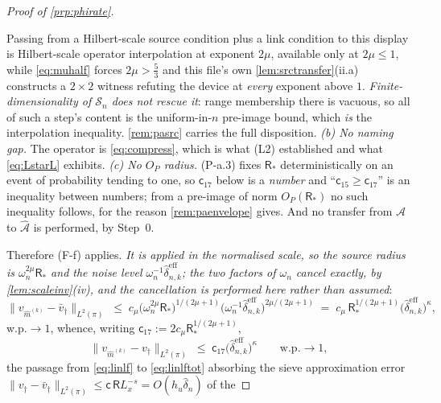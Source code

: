 \begin{proof}[Proof of \cref{prp:phirate}]
\begin{enumerate}
Passing from a Hilbert-scale source condition plus a link condition to this display is Hilbert-scale
operator interpolation at exponent $2\mu$, available only at
$2\mu\le1$, while \eqref{eq:muhalf} forces $2\mu>\tfrac53$ and this file's own
\cref{lem:srctransfer}(ii.a) constructs a $2\times2$ witness refuting the device at \emph{every}
exponent above $1$.
\emph{Finite-dimensionality of $\mathcal S_n$ does not rescue it}: range membership there is vacuous, so
all of such a step's content is the uniform-in-$n$ pre-image bound, which \emph{is} the interpolation
inequality. \cref{rem:pasrc} carries the full disposition. \emph{(b) No naming gap.} The operator is
\eqref{eq:compress}, which is what (L2) established and what \eqref{eq:LstarL} exhibits. \emph{(c) No
$O_P$ radius.} (P-a.3) fixes $\mathsf R_\ast$ deterministically on an event of probability tending to
one, so $\mathsf c_{17}$ below is a \emph{number} and ``$\mathsf c_{15}\ge\mathsf c_{17}$'' is an
inequality between numbers; from a pre-image of norm $O_P(\mathsf R_\ast)$
no such inequality follows, for the reason \cref{rem:paenvelope} gives.
And no transfer from $\mathcal A$ to $\hat{\mathcal A}$ is performed, by Step~0.
\end{enumerate}
Therefore (F-f) applies. \emph{It is applied in the normalised scale, so the source radius is
$\omega_n^{2\mu}\mathsf R_\ast$ and the noise level $\omega_n^{-1}\hat\delta^{\mathrm{eff}}_{n,k}$; the
two factors of $\omega_n$ cancel exactly, by \cref{lem:scaleinv}(iv), and the cancellation is
performed here rather than assumed}:
\begin{equation}\label{eq:linlf}
\big\|v_{\hat m^{(k)}}-\bar v_\dagger\big\|_{L^{2}(\pi)}
\;\le\;c_\mu\big(\omega_n^{2\mu}\mathsf R_\ast\big)^{1/(2\mu+1)}
\big(\omega_n^{-1}\hat\delta^{\mathrm{eff}}_{n,k}\big)^{2\mu/(2\mu+1)}
\;=\;c_\mu\,\mathsf R_\ast^{1/(2\mu+1)}\big(\hat\delta^{\mathrm{eff}}_{n,k}\big)^{\kappa} ,
\end{equation}
w.p.$\to1$, whence, writing $\mathsf c_{17}:=2c_\mu\mathsf R_\ast^{1/(2\mu+1)}$,
\begin{equation}\label{eq:linlftot}
\big\|v_{\hat m^{(k)}}-v_\dagger\big\|_{L^{2}(\pi)}
\;\le\;\mathsf c_{17}\big(\hat\delta^{\mathrm{eff}}_{n,k}\big)^{\kappa}
\qquad\text{w.p.}\to1 ,
\end{equation}
the passage from \eqref{eq:linlf} to \eqref{eq:linlftot} absorbing the sieve approximation error
$\|v_\dagger-\bar v_\dagger\|_{L^{2}(\pi)}\le\mathsf c\,\mathsf RL_x^{-s}=O(h_u\hat\delta_n)$ of the

\end{proof}
